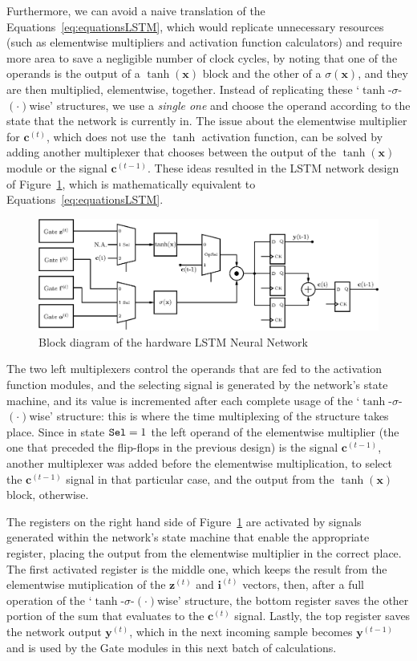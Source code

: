 \documentclass[conference]{IEEEtran}
\newcommand{\mb}[1]{\mathbf{#1}}
\begin{document}
Furthermore, we can avoid a naive translation of the Equations~\ref{eq:equationsLSTM}, which would replicate unnecessary resources (such as elementwise multipliers
and activation function calculators) and require more area to save a negligible number of clock cycles, by noting that one of the operands is the output
of a $\tanh(\mb{x})$ block and the other of a $\sigma(\mb{x})$, and they are then multiplied, elementwise, together. Instead of replicating
these `$\tanh$-$\sigma$-$(\cdot)$wise' structures, we use a \emph{single one} and choose the operand according to the state that the network is currently in. The
issue about the elementwise multiplier for $\mb{c}^{(t)}$, which does not use the $\tanh$ activation function, can be solved by adding another multiplexer that chooses
between the output of the $\tanh(\mb{x})$ module or the signal $\mb{c}^{(t-1)}$. These ideas resulted in the LSTM network design of Figure~\ref{fig:network-opt}, which
is mathematically equivalent to Equations~\ref{eq:equationsLSTM}.

\begin{figure}
    \centering
    \includegraphics[width=0.9\linewidth]{figures/network-opt.eps}
    \caption[Block diagram of the hardware LSTM Neural Network]{Block diagram of the hardware LSTM Neural Network}
    \label{fig:network-opt}
\end{figure}
The two left multiplexers control the operands that are fed to the activation function modules, and the selecting signal is generated by the network's state machine,
and its value is incremented after each complete usage of the `$\tanh$-$\sigma$-$(\cdot)$wise' structure: this is where the time multiplexing of the structure takes place.
Since in state $\verb+Sel+=1$ the left operand of the elementwise multiplier (the one that preceded the flip-flops in the previous design) is the signal $\mb{c}^{(t-1)}$,
another multiplexer was added before the elementwise multiplication, to select the $\mb{c}^{(t-1)}$ signal in that particular case, and the output from the $\tanh(\mb{x})$ block, otherwise.

The registers on the right hand side of Figure~\ref{fig:network-opt} are activated by signals generated within the network's state machine that enable the appropriate register, placing the
output from the elementwise multiplier in the correct place. The first activated register is the middle one, which keeps the result from the elementwise mutiplication of the $\mb{z}^{(t)}$
and $\mb{i}^{(t)}$ vectors, then, after a full operation of the `$\tanh$-$\sigma$-$(\cdot)$wise' structure, the bottom register saves the other portion of the sum that evaluates to the $\mb{c}^{(t)}$
signal. Lastly, the top register saves the network output $\mb{y}^{(t)}$, which in the next incoming sample becomes $\mb{y}^{(t-1)}$ and is used by the Gate modules in this next batch of calculations.
\end{document}
